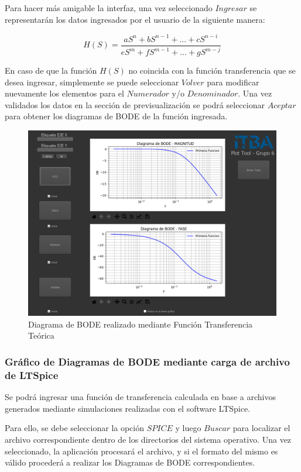 Para hacer más amigable la interfaz, una vez seleccionado $Ingresar$ se representarán los datos ingresados por el usuario de la siguiente manera:

$$H(S) = \frac{aS^n + bS^{n-1}+ ... +cS^{n-i}}{eS^m + fS^{m-1}+ ... +gS^{m-j}} $$

En caso de que la función $H(S)$ no coincida con la función transferencia que se desea ingresar, simplemente se puede seleccionar $Volver$ para modificar nuevamente los elementos para el $Numerador$ y/o $Denominador$. 
Una vez validados los datos en la sección de previsualización se podrá seleccionar $Aceptar$ para obtener los diagramas de BODE de la función ingresada.

\begin{figure}[!htb] 
    \centering 
    \includegraphics [width=0.8
    \textwidth] {../EJ2/LatexScreenshots/plotToolTeorica.png} 
    \caption{Diagrama de BODE realizado mediante Función Transferencia Teórica}
    \label{fig:transferFunctionPlotTool}
\end{figure}

\subsubsection{Gráfico de Diagramas de BODE mediante carga de archivo de LTSpice}

Se podrá ingresar una función de transferencia calculada en base a archivos generados mediante simulaciones realizadas con el software LTSpice.

Para ello, se debe seleccionar la opción $SPICE$ y luego $Buscar$ para localizar el archivo correspondiente dentro de los directorios del sistema operativo. 
Una vez seleccionado, la aplicación procesará el archivo, y si el formato del mismo es válido procederá a realizar los Diagramas de BODE correspondientes.

